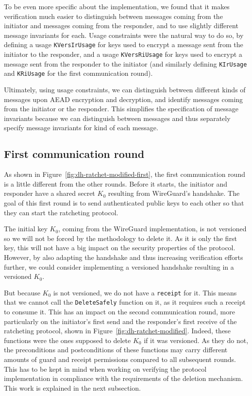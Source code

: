 To be even more specific about the implementation, we found that it makes verification much easier to distinguish between messages coming from the initiator and messages coming from the responder, and to use slightly different message invariants for each.
Usage constraints were the natural way to do so, by defining a usage \texttt{KVersIrUsage} for keys used to encrypt a message sent from the initiator to the responder, and a usage \texttt{KVersRiUsage} for keys used to encrypt a message sent from the responder to the initiator (and similarly defining \texttt{KIrUsage} and \texttt{KRiUsage} for the first communication round).

Ultimately, using usage constraints, we can distinguish between different kinds of messages upon AEAD encryption and decryption, and identify messages coming from the initiator or the responder.
This simplifies the specification of message invariants because we can distinguish between messages and thus separately specify message invariants for kind of each message.

\subsection{First communication round}
\label{sec:first-communication-round}

As shown in Figure~\ref{fig:dh-ratchet-modified-first}, the first communication round is a little different from the other rounds.
Before it starts, the initiator and responder have a shared secret $K_0$ resulting from WireGuard's handshake.
The goal of this first round is to send authenticated public keys to each other so that they can start the ratcheting protocol.

The initial key $K_0$, coming from the WireGuard implementation, is not versioned so we will not be forced by the methodology to delete it. As it is only the first key, this will not have a big impact on the security properties of the protocol.
However, by also adapting the handshake and thus increasing verification efforts further, we could consider implementing a versioned handshake resulting in a versioned $K_0$.

But because $K_0$ is not versioned, we do not have a \texttt{receipt} for it.
This means that we cannot call the \texttt{DeleteSafely} function on it, as it requires such a receipt to consume it.
This has an impact on the second communication round, more particularly on the initiator's first send and the responder's first receive of the ratcheting protocol, shown in Figure~\ref{fig:dh-ratchet-modified}.
Indeed, these functions were the ones supposed to delete $K_0$ if it was versioned.
As they do not, the preconditions and postconditions of these functions may carry different amounts of guard and receipt permissions compared to all subsequent rounds.
This has to be kept in mind when working on verifying the protocol implementation in compliance with the requirements of the deletion mechanism.
This work is explained in the next subsection.

